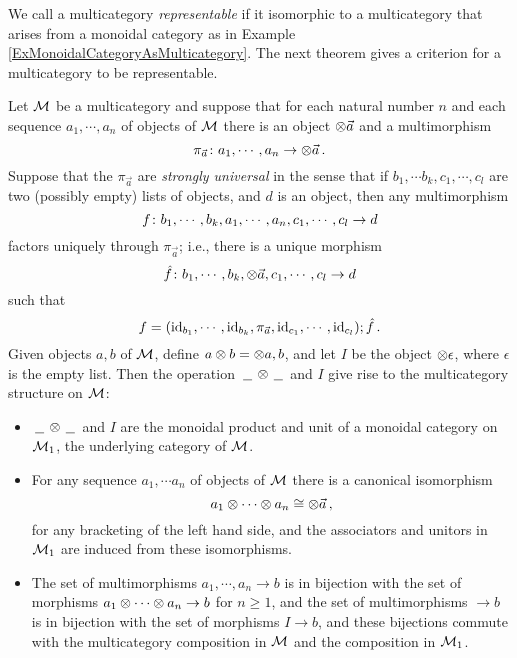 We call a multicategory \emph{representable} if it isomorphic to a multicategory that arises from a monoidal category as in Example \ref{ExMonoidalCategoryAsMulticategory}.
The next theorem gives a criterion for a multicategory to be representable.

\begin{theorem}
  \label{TheRepresentableMulticategories}
  Let $\mathcal M$ be a multicategory and suppose that for each natural number $n$ and each sequence $a_1,\cdots,a_n$ of objects of $\mathcal M$ there is an object $\otimes \vec{a}$ and a multimorphism
  \[
    \pi_{\vec a} \colon a_1,\cdots,a_n \to \otimes \vec a\,.
    \]
  Suppose that the $\pi_{\vec a}$ are \emph{strongly universal} in the sense that if $b_1,\cdots b_k, c_1,\cdots,c_l$ are two (possibly empty) lists of objects, and $d$ is an object, then any multimorphism
  \[
    f \colon b_1,\cdots,b_k,a_1,\cdots,a_n,c_1,\cdots,c_l \to d
    \]
  factors uniquely through $\pi_{\vec a}$; i.e., there is a unique morphism
  \[
    \hat{f} \colon b_1,\cdots,b_k,\otimes\vec{a},c_1,\cdots,c_l \to d
    \]
  such that
  \[
    f=(\operatorname{id}_{b_1},\cdots,\operatorname{id}_{b_k},\pi_{\vec a},\operatorname{id}_{c_1},\cdots,\operatorname{id}_{c_l});\hat{f}\,.
    \]
  Given objects $a,b$ of $\mathcal M$, define $a\otimes b = \otimes a,b$, and let $I$ be the object $\otimes\epsilon$, where $\epsilon$ is the empty list.  
  Then the operation $\,\underline{\hspace{1.5ex}}\,\otimes\,\underline{\hspace{1.5ex}}\,$ and $I$ give rise to the multicategory structure on $\mathcal M$:
  \begin{itemize}
    \item $\,\underline{\hspace{1.5ex}}\,\otimes\,\underline{\hspace{1.5ex}}\,$ and $I$ are the monoidal product and unit of a monoidal category on $\mathcal M_1$, the underlying category of $\mathcal M$.
    \item For any sequence $a_1,\cdots a_n$ of objects of $\mathcal M$ there is a canonical isomorphism
      \[
        a_1 \otimes \cdots \otimes a_n \cong \otimes \vec a\,,
        \]
      for any bracketing of the left hand side, and the associators and unitors in $\mathcal M_1$ are induced from these isomorphisms.
    \item The set of multimorphisms $a_1,\cdots,a_n \to b$ is in bijection with the set of morphisms $a_1\otimes\cdots\otimes a_n \to b$ for $n\ge1$, and the set of multimorphisms $\to b$ is in bijection with the set of morphisms $I \to b$, and these bijections commute with the multicategory composition in $\mathcal M$ and the composition in $\mathcal M_1$.
  \end{itemize}
\end{theorem}

